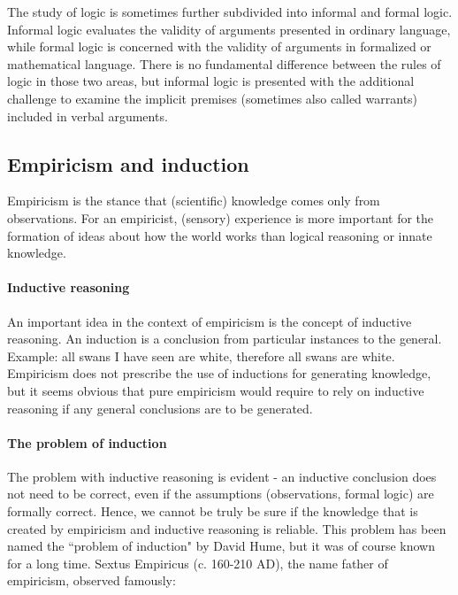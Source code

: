 \documentclass{tufte-book}
\begin{document}
The study of logic is sometimes further subdivided into informal and formal logic. Informal logic evaluates the validity of arguments presented in ordinary language, while formal logic is concerned with the validity of arguments in formalized or mathematical language. There is no fundamental difference between the rules of logic in those two areas, but informal logic is presented with the additional challenge to examine the implicit premises (sometimes also called warrants) included in verbal arguments. 


\subsection{Empiricism and induction}

Empiricism is the stance that (scientific) knowledge comes only from observations. For an empiricist, (sensory) experience is more important for the formation of ideas about how the world works than logical reasoning or innate knowledge. 

\paragraph{Inductive reasoning} An important idea in the context of empiricism is the concept of inductive reasoning. An induction is a conclusion from particular instances to the general. Example: all swans I have seen are white, therefore all swans are white. Empiricism does not prescribe the use of inductions for generating knowledge, but it seems obvious that pure empiricism would require to rely on inductive reasoning if any general conclusions are to be generated. 


\paragraph{The problem of induction}The problem with inductive reasoning is evident - an inductive conclusion does not need to be correct, even if the assumptions (observations, formal logic) are formally correct. Hence, we cannot be truly be sure if the knowledge that is created by empiricism and inductive reasoning is reliable. This problem has been named the ``problem of induction" by David Hume, but it was of course known for a long time. Sextus Empiricus (c. 160-210 AD), the name father of empiricism, observed famously:
\end{document}
